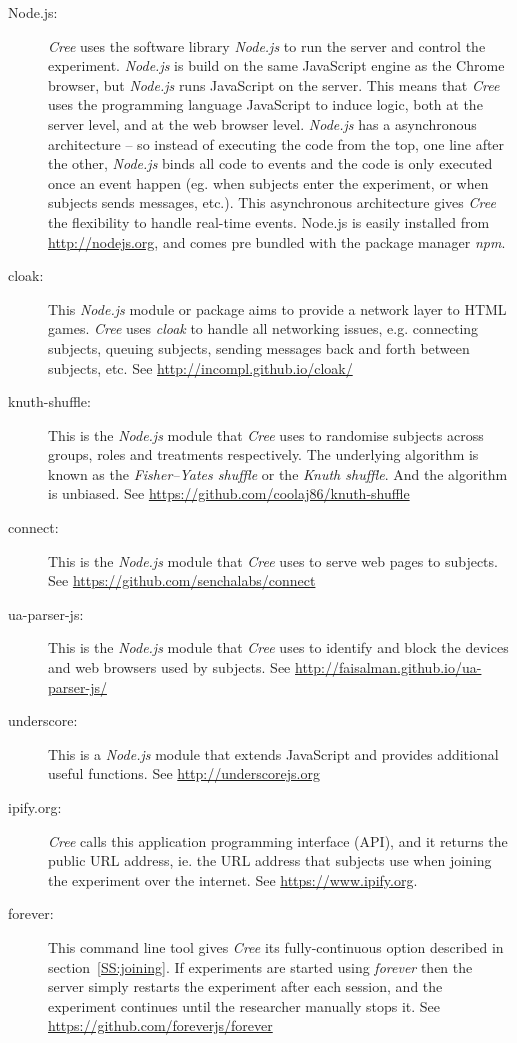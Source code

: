 \documentclass[preprint, 12pt]{elsarticle}
\newcommand{\Cree}{\emph{Cree}\xspace}
\begin{document}
\begin{description}
  \item[Node.js:] \Cree uses the software library \emph{Node.js} to run the server and control the experiment. \emph{Node.js} is build on the same JavaScript engine as the Chrome browser, but \emph{Node.js} runs JavaScript on the server. This means that \Cree uses the programming language JavaScript to induce logic, both at the server level, and at the web browser level. \emph{Node.js} has a asynchronous architecture -- so instead of executing the code from the top, one line after the other, \emph{Node.js} binds all code to events and the code is only executed once an event happen (eg. when subjects enter the experiment, or when subjects sends messages, etc.). This asynchronous architecture gives \Cree the flexibility to handle real-time events. Node.js is easily installed from \url{http://nodejs.org}, and comes pre bundled with the package manager \emph{npm}.
  \item[cloak:] This \emph{Node.js} module or package aims to provide a network layer to HTML games. \Cree uses \emph{cloak} to handle all networking issues, e.g. connecting subjects, queuing subjects, sending messages back and forth between subjects, etc. See \url{http://incompl.github.io/cloak/}
  \item[knuth-shuffle:] This is the \emph{Node.js} module that \Cree uses to randomise subjects across groups, roles and treatments respectively. The underlying algorithm is known as the \emph{Fisher–Yates shuffle} or the \emph{Knuth shuffle}. And the algorithm is unbiased. See \url{https://github.com/coolaj86/knuth-shuffle}
  \item[connect:] This is the \emph{Node.js} module that \Cree uses to serve web pages to subjects. See \url{https://github.com/senchalabs/connect}
  \item[ua-parser-js:] This is the \emph{Node.js} module that \Cree uses to identify and block the devices and web browsers used by subjects. See \url{http://faisalman.github.io/ua-parser-js/}
  \item[underscore:] This is a \emph{Node.js} module that extends JavaScript and provides additional useful functions. See \url{http://underscorejs.org}
  \item[ipify.org:] \Cree calls this application programming interface (API), and it returns the public URL address, ie. the URL address that subjects use when joining the experiment over the internet. See \url{https://www.ipify.org}.
  \item[forever:] This command line tool gives \Cree its fully-continuous option described in section~\ref{SS:joining}. If experiments are started using \emph{forever} then the server simply restarts the experiment after each session, and the experiment continues until the researcher manually stops it. See \url{https://github.com/foreverjs/forever}

\end{description}
\end{document}
